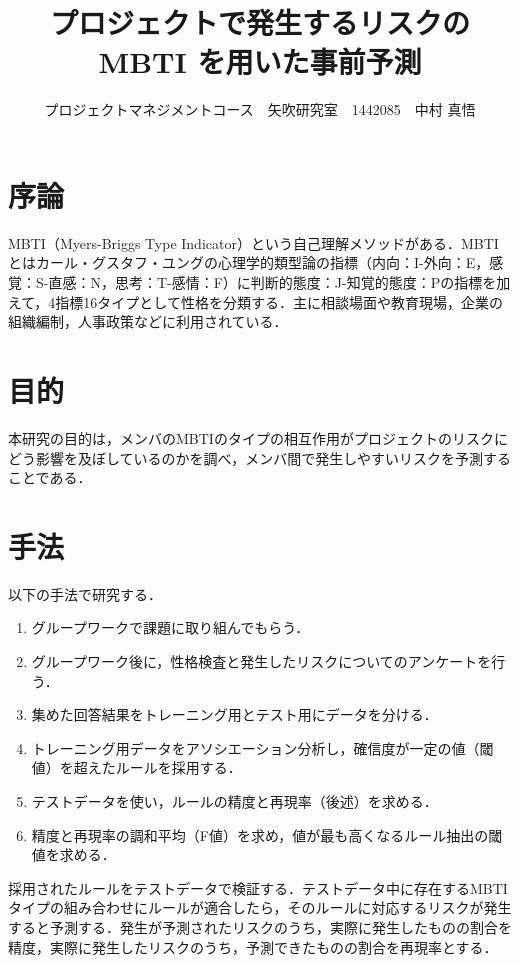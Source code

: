 \documentclass[uplatex,twocolumn,dvipdfmx]{jsarticle}
\title{\vspace{-5mm}\fontsize{14pt}{0pt}\selectfont プロジェクトで発生するリスクのMBTI を用いた事前予測}
\author{\normalsize プロジェクトマネジメントコース　矢吹研究室　1442085　中村 真悟}
\date{}
\begin{document}
\fontsize{10.5pt}{\baselineskip}\selectfont
\maketitle





\section{序論}\label{序論}
MBTI（Myers-Briggs Type Indicator）という自己理解メソッドがある．MBTIとはカール・グスタフ・ユングの心理学的類型論の指標（内向：I-外向：E，感覚：S-直感：N，思考：T-感情：F）に判断的態度：J-知覚的態度：Pの指標を加えて，4指標16タイプとして性格を分類する．主に相談場面や教育現場，企業の組織編制，人事政策などに利用されている\cite{110001230195}．

\section{目的}

本研究の目的は，メンバのMBTIのタイプの相互作用がプロジェクトのリスクにどう影響を及ぼしているのかを調べ，メンバ間で発生しやすいリスクを予測することである．
\section{手法}

以下の手法で研究する．
\begin{enumerate}
\item グループワークで課題に取り組んでもらう．
\item グループワーク後に，性格検査と発生したリスクについてのアンケートを行う．
\item 集めた回答結果をトレーニング用とテスト用にデータを分ける．
\item トレーニング用データをアソシエーション分析し，確信度が一定の値（閾値）を超えたルールを採用する．
\item テストデータを使い，ルールの精度と再現率（後述）を求める．
\item 精度と再現率の調和平均（F値）を求め，値が最も高くなるルール抽出の閾値を求める．
\end{enumerate}

採用されたルールをテストデータで検証する．テストデータ中に存在するMBTIタイプの組み合わせにルールが適合したら，そのルールに対応するリスクが発生すると予測する．発生が予測されたリスクのうち，実際に発生したものの割合を精度，実際に発生したリスクのうち，予測できたものの割合を再現率とする．
\end{document}
